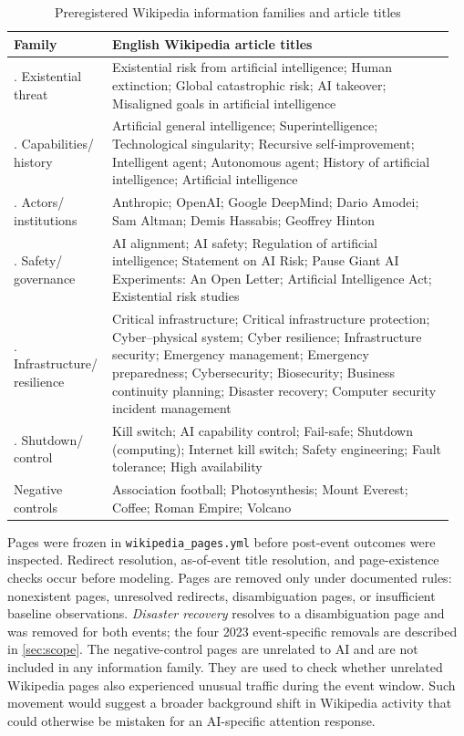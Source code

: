 \elsevierclasstrue\documentclass[preprint,12pt]{elsarticle}%
\begin{document}
\begin{table}[ht!]
\centering
\footnotesize
\caption{Preregistered Wikipedia information families and article titles}
\label{tab:families}

\begin{tabular}{>{\raggedright\arraybackslash}p{0.2\linewidth}>{\raggedright\arraybackslash}p{0.76\linewidth}}
\toprule
Family & English Wikipedia article titles \\
\midrule
1. Existential threat &
Existential risk from artificial intelligence; Human extinction; Global catastrophic risk; AI takeover; Misaligned goals in artificial intelligence \\
2. Capabilities/ history &
Artificial general intelligence; Superintelligence; Technological singularity; Recursive self-improvement; Intelligent agent; Autonomous agent; History of artificial intelligence; Artificial intelligence \\
3. Actors/ institutions &
Anthropic; OpenAI; Google DeepMind; Dario Amodei; Sam Altman; Demis Hassabis; Geoffrey Hinton \\
4. Safety/ governance &
AI alignment; AI safety; Regulation of artificial intelligence; Statement on AI Risk; Pause Giant AI Experiments: An Open Letter; Artificial Intelligence Act; Existential risk studies \\
5. Infrastructure/ resilience &
Critical infrastructure; Critical infrastructure protection; Cyber--physical system; Cyber resilience; Infrastructure security; Emergency management; Emergency preparedness; Cybersecurity; Biosecurity; Business continuity planning; Disaster recovery; Computer security incident management \\
6. Shutdown/ control &
Kill switch; AI capability control; Fail-safe; Shutdown (computing); Internet kill switch; Safety engineering; Fault tolerance; High availability \\
\midrule
Negative controls &
Association football; Photosynthesis; Mount Everest; Coffee; Roman Empire; Volcano \\
\bottomrule
\end{tabular}
\end{table}


Pages were frozen in \texttt{wikipedia\_pages.yml} before post-event outcomes were inspected. Redirect resolution, as-of-event title resolution, and page-existence checks occur before modeling. Pages are removed only under documented rules: nonexistent pages, unresolved redirects, disambiguation pages, or insufficient baseline observations. \emph{Disaster recovery} resolves to a disambiguation page and was removed
for both events; the four 2023 event-specific removals are described in
\cref{sec:scope}. The negative-control pages are unrelated to AI and are not included in any information family. They are used to check whether unrelated Wikipedia pages also experienced unusual traffic during the event window. Such movement would suggest a broader background shift in Wikipedia activity that could otherwise be mistaken for an AI-specific attention response.
\end{document}
